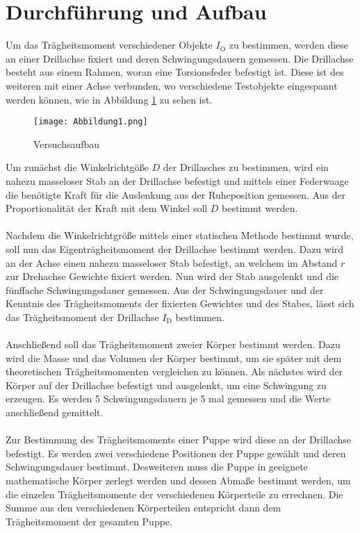 \section{Durchführung und Aufbau}
\label{sec:Durchführung}
Um das Trägheitsmoment verschiedener Objekte $I_\text{O}$ zu bestimmen, werden diese an einer Drillachse fixiert und deren Schwingungsdauern gemessen. Die Drillachse besteht aus einem Rahmen, woran eine Torsionsfeder befestigt ist. Diese ist des weiteren mit einer Achse verbunden, wo verschiedene Testobjekte eingespannt werden können, wie in Abbildung \ref{fig:drillachse} zu sehen ist.
\ \\
\begin{figure}[ht]
	\centering
	\texttt{[image: Abbildung1.png]}
	\caption{Versuchsaufbau\cite{sample}}
	\label{fig:drillachse}
\end{figure}

Um zunächst die Winkelrichtgöße $D$ der Drillasches zu bestimmen, wird ein nahezu masseloser Stab an der Drillachse befestigt und mittels einer Federwaage die benötigte Kraft für die  Auslenkung aus der Ruheposition gemessen. Aus der Proportionalität der Kraft mit dem Winkel soll $D$ bestimmt werden.
\\
\\
Nachdem die Winkelrichtgröße mittels einer statischen Methode bestimmt wurde, soll nun das Eigenträgheitsmoment der Drillachse bestimmt werden. Dazu wird an der Achse einen nahezu masseloser Stab befestigt, an welchem im Abstand $r$ zur Drehachse Gewichte fixiert werden. Nun wird der Stab ausgelenkt und die fünffache Schwingungsdauer gemessen. Aus der Schwingungsdauer und der Kenntnis des Trägheitsmoments der fixierten Gewichtes und des Stabes, lässt sich das Trägheitsmoment der Drillachse $I_\text{D}$ bestimmen.
\\
\\
Anschließend soll das Trägheitsmoment zweier Körper bestimmt werden. Dazu wird die Masse und das Volumen der Körper bestimmt, um sie später mit dem theoretischen Trägheitsmomenten vergleichen zu können. Als nächstes wird der Körper auf der Drillachse befestigt und ausgelenkt, um eine Schwingung zu erzeugen. Es werden 5 Schwingungsdauern je 5 mal gemessen und die Werte anschließend gemittelt.
\\
\\
Zur Bestimmung des Trägheitsmoments einer Puppe wird diese an der Drillachse befestigt. Es werden zwei verschiedene Positionen der Puppe gewählt und deren Schwingungsdauer bestimmt. Desweiteren muss die Puppe in geeignete mathematische Körper zerlegt werden und dessen Abmaße bestimmt werden, um die einzelen Trägheitsmomente der verschiedenen Körperteile zu errechnen. Die Summe aus den verschiedenen Körperteilen entspricht dann dem Trägheitsmoment der gesamten Puppe.
